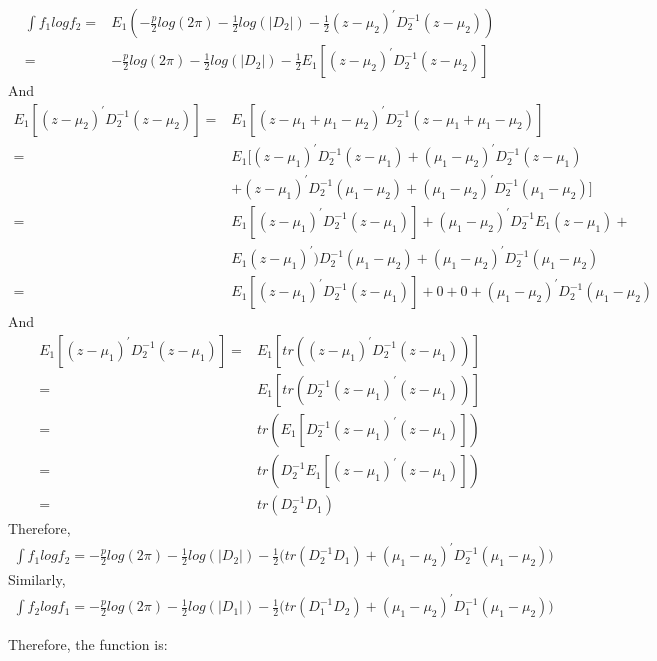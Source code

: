 \documentclass[12pt]{article}
\begin{document}
$$\begin{aligned}
\int f_1 log f_2 =  & E_1(-\frac{p}{2} log(2\pi) - \frac{1}{2}log(|D_2|) -\frac{1}{2}(z - \mu_2)^{\prime} D_2^{-1}(z - \mu_2)) \\
= & -\frac{p}{2} log(2\pi) - \frac{1}{2}log(|D_2|) -\frac{1}{2} E_1[(z - \mu_2)^{\prime} D_2^{-1}(z - \mu_2)] 
\end{aligned}$$
And
$$\begin{aligned} 
E_1[(z - \mu_2)^{\prime} D_2^{-1}(z - \mu_2)] =& E_1[(z - \mu_1 + \mu_1 - \mu_2)^{\prime} D_2^{-1}(z - \mu_1 + \mu_1 - \mu_2)] \\
=& E_1[(z - \mu_1)^{\prime}D_2^{-1}(z - \mu_1) + (\mu_1 -\mu_2)^{\prime}D_2^{-1}(z - \mu_1) \\
 & + (z - \mu_1)^{\prime}D_2^{-1} (\mu_1 -\mu_2) + (\mu_1 -\mu_2)^{\prime}D_2^{-1}(\mu_1 -\mu_2)] \\
=& E_1[(z - \mu_1)^{\prime}D_2^{-1}(z - \mu_1)] + (\mu_1 -\mu_2)^{\prime}D_2^{-1}E_1(z - \mu_1) + \\
 & E_1(z - \mu_1)^{\prime})D_2^{-1} (\mu_1 -\mu_2) +  (\mu_1 -\mu_2)^{\prime}D_2^{-1}(\mu_1 -\mu_2)\\
=&E_1[(z - \mu_1)^{\prime}D_2^{-1}(z - \mu_1)]  + 0 + 0 +  (\mu_1 -\mu_2)^{\prime}D_2^{-1}(\mu_1 -\mu_2)
\end{aligned}$$
And 
$$\begin{aligned}
E_1[(z - \mu_1)^{\prime}D_2^{-1}(z - \mu_1)] =& E_1[tr((z - \mu_1)^{\prime}D_2^{-1}(z - \mu_1))] \\
=& E_1[tr(D_2^{-1}(z - \mu_1)^{\prime}(z - \mu_1))] \\
=& tr(E_1[D_2^{-1}(z - \mu_1)^{\prime}(z - \mu_1)]) \\
=& tr(D_2^{-1} E_1[(z - \mu_1)^{\prime}(z - \mu_1)]) \\
=& tr(D_2^{-1} D_1)
\end{aligned}$$
Therefore, 
$$\begin{aligned}
\int f_1 log f_2 = -\frac{p}{2} log(2\pi) - \frac{1}{2}log(|D_2|) -\frac{1}{2}\big( tr(D_2^{-1} D_1) + (\mu_1 -\mu_2)^{\prime}D_2^{-1}(\mu_1 -\mu_2)\big)
\end{aligned}$$
Similarly,
$$\begin{aligned}
\int f_2 log f_1 = -\frac{p}{2} log(2\pi) - \frac{1}{2}log(|D_1|) -\frac{1}{2}\big( tr(D_1^{-1} D_2) + (\mu_1 -\mu_2)^{\prime}D_1^{-1}(\mu_1 -\mu_2)\big)
\end{aligned}$$

Therefore, the function is:
\end{document}
